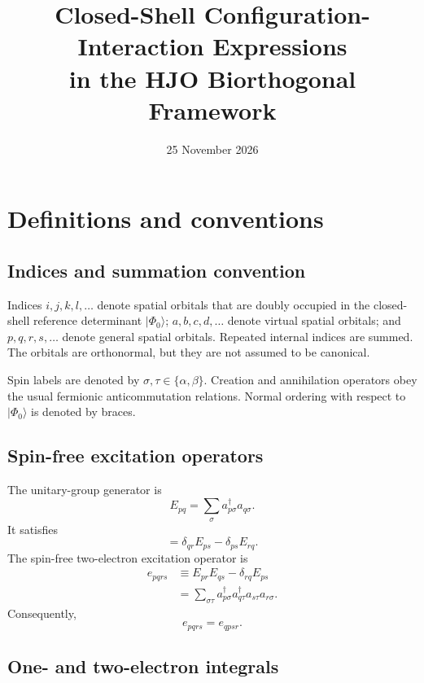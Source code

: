 \documentclass[10pt]{article}
\title{Closed-Shell Configuration-Interaction Expressions\\
       in the HJO Biorthogonal Framework}
\author{}
\date{25 November 2026}
\newcommand{\vac}{\Phi_0}
\begin{document}
\maketitle
\begingroup
\small
\tableofcontents
\endgroup

\section{Definitions and conventions}

\subsection{Indices and summation convention}

Indices $i,j,k,l,\ldots$ denote spatial orbitals that are doubly occupied in
the closed-shell reference determinant $\lvert\vac\rangle$;
$a,b,c,d,\ldots$ denote virtual spatial orbitals; and
$p,q,r,s,\ldots$ denote general spatial orbitals. Repeated internal indices
are summed. The orbitals are orthonormal, but they are not assumed to be
canonical.

Spin labels are denoted by $\sigma,\tau\in\{\alpha,\beta\}$. Creation and
annihilation operators obey the usual fermionic anticommutation relations.
Normal ordering with respect to $\lvert\vac\rangle$ is denoted by braces.

\subsection{Spin-free excitation operators}

The unitary-group generator is
\begin{equation}
 E_{pq}
 =\sum_{\sigma}a_{p\sigma}^{\dagger}a_{q\sigma}.
\end{equation}
It satisfies
\begin{equation}
 [E_{pq},E_{rs}]
 =\delta_{qr}E_{ps}-\delta_{ps}E_{rq}.
\end{equation}
The spin-free two-electron excitation operator is
\begin{align}
 e_{pqrs}
 &\equiv E_{pr}E_{qs}-\delta_{rq}E_{ps}
 \\
 &=\sum_{\sigma\tau}
   a_{p\sigma}^{\dagger}a_{q\tau}^{\dagger}
   a_{s\tau}a_{r\sigma}.
\end{align}
Consequently,
\begin{equation}
 e_{pqrs}=e_{qpsr}.
\end{equation}

\subsection{One- and two-electron integrals}
\end{document}
